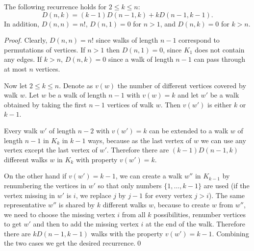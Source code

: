 \begin{lemma}\label{RecurenceLemma}
The following recurrence holds for $2\leq k\leq n$:
$$D(n,k)=(k-1) D(n-1,k) + k D(n-1,k-1).$$
In addition, $D(n,n)=n!$, $D(n,1) = 0$ for $n>1$, and $D(n,k) = 0$ for $k>n$.
\end{lemma}
\begin{proof}
Clearly, $D(n,n)=n!$ since walks of length $n-1$ correspond to
permutations of vertices.  If $n>1$ then $D(n,1)=0$, since $K_1$ does
not contain any edges.  If $k>n$, $D(n,k)=0$ since a walk of length
$n-1$ can pass through at most $n$ vertices.

Now let $2\leq k\leq n$. Denote as $v(w)$ the number of different
vertices covered by walk $w$. Let $w$ be a walk of length $n-1$ with
$v(w)=k$ and let $w'$ be a walk obtained by taking the first 
$n-1$ vertices of walk $w$. Then $v(w')$ is either $k$ or $k-1$. 

Every walk $w'$ of length $n-2$ with $v(w')=k$ can be extended to a
walk $w$ of length $n-1$ in $K_k$ in $k-1$ ways, because as the last vertex
of $w$ we can use any vertex except the last vertex of $w'$. Therefore
there are $(k-1) D(n-1,k)$ different walks $w$ in $K_k$ with
property $v(w')=k$.

On the other hand if $v(w')=k-1$, we can create a walk $w''$ in
$K_{k-1}$ by renumbering the vertices in $w'$ so that only numbers
$\{1,\dots,k-1\}$ are used (if the vertex missing in $w'$ is $i$, we
replace $j$ by $j-1$ for every vertex $j>i$).  The same
representative $w''$ is shared by $k$ different walks $w$, because to
create $w$ from $w''$, we need to choose the missing vertex $i$ from
all $k$ possibilities, renumber vertices to get $w'$ and then to add
the missing vertex $i$ at the end of the walk. Therefore there are
$kD(n-1,k-1)$ walks with the property $v(w')=k-1$. Combining the two
cases we get the desired recurrence.\qed
\end{proof}

